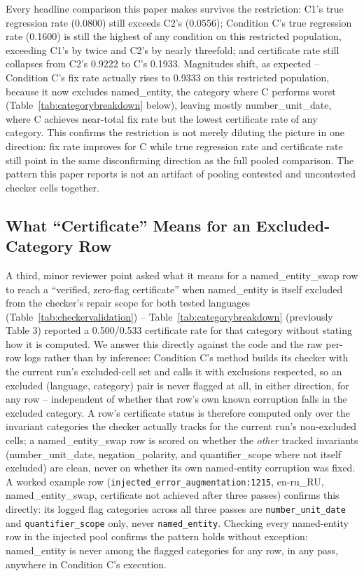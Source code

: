 \documentclass[11pt,letterpaper]{article}
\begin{document}
Every headline comparison this paper makes survives the restriction: C1's true regression rate (0.0800) still exceeds C2's (0.0556); Condition C's true regression rate (0.1600) is still the highest of any condition on this restricted population, exceeding C1's by twice and C2's by nearly threefold; and certificate rate still collapses from C2's 0.9222 to C's 0.1933. Magnitudes shift, as expected -- Condition C's fix rate actually rises to 0.9333 on this restricted population, because it now excludes named\_entity, the category where C performs worst (Table~\ref{tab:categorybreakdown} below), leaving mostly number\_unit\_date, where C achieves near-total fix rate but the lowest certificate rate of any category. This confirms the restriction is not merely diluting the picture in one direction: fix rate improves for C while true regression rate and certificate rate still point in the same disconfirming direction as the full pooled comparison. The pattern this paper reports is not an artifact of pooling contested and uncontested checker cells together.

\subsection{What ``Certificate'' Means for an Excluded-Category Row}

A third, minor reviewer point asked what it means for a named\_entity\_swap row to reach a ``verified, zero-flag certificate'' when named\_entity is itself excluded from the checker's repair scope for both tested languages (Table~\ref{tab:checkervalidation}) -- Table~\ref{tab:categorybreakdown} (previously Table 3) reported a 0.500/0.533 certificate rate for that category without stating how it is computed. We answer this directly against the code and the raw per-row logs rather than by inference: Condition C's method builds its checker with the current run's excluded-cell set and calls it with exclusions respected, so an excluded (language, category) pair is never flagged at all, in either direction, for any row -- independent of whether that row's own known corruption falls in the excluded category. A row's certificate status is therefore computed only over the invariant categories the checker actually tracks for the current run's non-excluded cells; a named\_entity\_swap row is scored on whether the \emph{other} tracked invariants (number\_unit\_date, negation\_polarity, and quantifier\_scope where not itself excluded) are clean, never on whether its own named-entity corruption was fixed. A worked example row (\texttt{injected\_error\_augmentation:1215}, en-ru\_RU, named\_entity\_swap, certificate not achieved after three passes) confirms this directly: its logged flag categories across all three passes are \texttt{number\_unit\_date} and \texttt{quantifier\_scope} only, never \texttt{named\_entity}. Checking every named-entity row in the injected pool confirms the pattern holds without exception: named\_entity is never among the flagged categories for any row, in any pass, anywhere in Condition C's execution.
\end{document}

